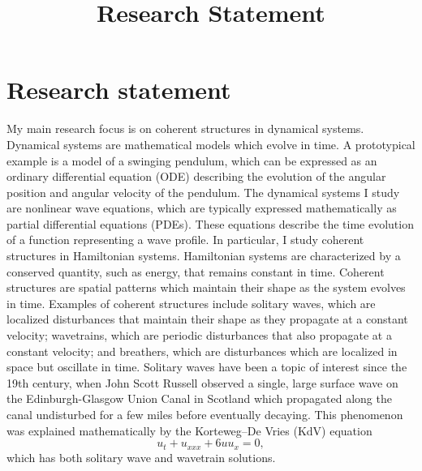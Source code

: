 \documentclass[12pt,reqno,oneside,hidelinks]{article}
\title{Research Statement}
\date{\vspace{-12ex}}
\begin{document}
\thispagestyle{empty}

\section*{Research statement}

My main research focus is on coherent structures in dynamical systems. Dynamical systems are mathematical models which evolve in time. A prototypical example is a model of a swinging pendulum, which can be expressed as an ordinary differential equation (ODE) describing the evolution of the angular position and angular velocity of the pendulum. The dynamical systems I study are nonlinear wave equations, which are typically expressed mathematically as partial differential equations (PDEs). These equations describe the time evolution of a function representing a wave profile. In particular, I study coherent structures in Hamiltonian systems. 
Hamiltonian systems are characterized by a conserved quantity, such as energy, that remains constant in time. Coherent structures are spatial patterns which maintain their shape as the system evolves in time. Examples of coherent structures include solitary waves, which are localized disturbances that maintain their shape as they propagate at a constant velocity; wavetrains, which are periodic disturbances that also propagate at a constant velocity; and breathers, which are disturbances which are localized in space but oscillate in time. Solitary waves have been a topic of interest since the 19th century, when John Scott Russell observed a single, large surface wave on the Edinburgh-Glasgow Union Canal in Scotland which propagated along the canal undisturbed for a few miles before eventually decaying. This phenomenon was explained mathematically by the Korteweg–De Vries (KdV) equation 
\[
u_t + u_{xxx} + 6 u u_x = 0,
\]
which has both solitary wave and wavetrain solutions.
\end{document}
